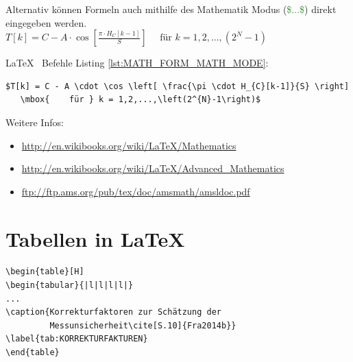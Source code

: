 \documentclass[TGAI_Laborbericht.tex]{subfiles}
\begin{document}
Alternativ können Formeln auch mithilfe des Mathematik Modus (\textcolor{ForestGreen}{\$...\$}) direkt eingegeben werden.\linebreak
$T[k]=C-A\cdot\cos\left[\frac{\pi \cdot H_{C}[k-1]}{S}\right]   \text{~~~~für } k \equal 1,2,...,\left(2^{N}-1\right)$
\newpage

\LaTeX ~ Befehle Listing \ref{lst:MATH_FORM_MATH_MODE}:
\begin{lstlisting}[style=LATEX, frame=single, caption=Mathematikmodus \LaTeX, captionpos=b, label=lst:MATH_FORM_MATH_MODE]
$T[k] = C - A \cdot \cos \left[ \frac{\pi \cdot H_{C}[k-1]}{S} \right]
   \mbox{    für } k = 1,2,...,\left(2^{N}-1\right)$
\end{lstlisting}
Weitere Infos:
\begin{itemize}
  \item \href{http://en.wikibooks.org/wiki/LaTeX/Mathematics}{http://en.wikibooks.org/wiki/LaTeX/Mathematics}
  \item \href{http://en.wikibooks.org/wiki/LaTeX/Advanced\_Mathematics}{http://en.wikibooks.org/wiki/LaTeX/Advanced\_Mathematics} 
  \item \href{ftp://ftp.ams.org/pub/tex/doc/amsmath/amsldoc.pdf}{ftp://ftp.ams.org/pub/tex/doc/amsmath/amsldoc.pdf}
\end{itemize}
\newpage

\section{Tabellen in \LaTeX}

\begin{lstlisting}[style=LATEX, frame=single, caption=\LaTeX ~Tabellen Prototyp, captionpos=b, label=lst:MATH_FORM]
\begin{table}[H]
\begin{tabular}{|l|l|l|l|}
...
\caption{Korrekturfaktoren zur Schätzung der 
         Messunsicherheit\cite[S.10]{Fra2014b}}
\label{tab:KORREKTURFAKTUREN}
\end{table}
\end{lstlisting}
~
\end{document}
